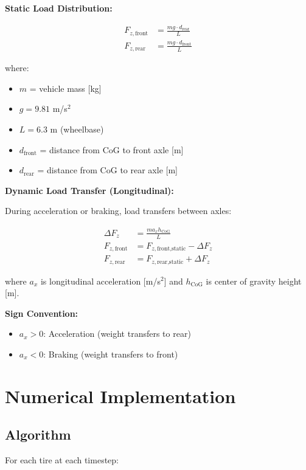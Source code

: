 \documentclass[11pt,a4paper]{article}
\begin{document}
\textbf{Static Load Distribution:}

\begin{align}
F_{z,\text{front}} &= \frac{mg \cdot d_{\text{rear}}}{L} \\
F_{z,\text{rear}} &= \frac{mg \cdot d_{\text{front}}}{L}
\end{align}

where:
\begin{itemize}
    \item $m$ = vehicle mass [kg]
    \item $g = 9.81$ m/s$^2$
    \item $L = 6.3$ m (wheelbase)
    \item $d_{\text{front}}$ = distance from CoG to front axle [m]
    \item $d_{\text{rear}}$ = distance from CoG to rear axle [m]
\end{itemize}

\textbf{Dynamic Load Transfer (Longitudinal):}

During acceleration or braking, load transfers between axles:

\begin{align}
\Delta F_z &= \frac{m a_x h_{\text{CoG}}}{L} \\
F_{z,\text{front}} &= F_{z,\text{front,static}} - \Delta F_z \\
F_{z,\text{rear}} &= F_{z,\text{rear,static}} + \Delta F_z
\end{align}

where $a_x$ is longitudinal acceleration [m/s$^2$] and $h_{\text{CoG}}$ is center of gravity height [m].

\textbf{Sign Convention:}
\begin{itemize}
    \item $a_x > 0$: Acceleration (weight transfers to rear)
    \item $a_x < 0$: Braking (weight transfers to front)
\end{itemize}

\newpage
\section{Numerical Implementation}

\subsection{Algorithm}

For each tire at each timestep:
\end{document}
